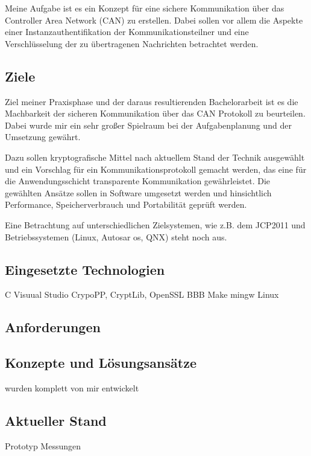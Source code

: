 Meine Aufgabe ist es ein Konzept für eine sichere Kommunikation über das Controller Area Network (CAN) zu erstellen. 
Dabei sollen vor allem die Aspekte einer Instanzauthentifikation der Kommunikationsteilner und eine Verschlüsselung der zu übertragenen Nachrichten betrachtet werden. 


\subsection{Ziele}
Ziel meiner Praxisphase und der daraus resultierenden Bachelorarbeit ist es die Machbarkeit der sicheren Kommunikation über das CAN Protokoll zu beurteilen.
\newline
Dabei wurde mir ein sehr großer Spielraum bei der Aufgabenplanung und der Umsetzung gewährt. 


 Dazu sollen kryptografische Mittel nach aktuellem Stand der Technik ausgewählt und ein Vorschlag für ein Kommunikationsprotokoll gemacht werden, das eine für die Anwendungsschicht transparente Kommunikation gewährleistet. Die gewählten Ansätze sollen in Software umgesetzt werden und hinsichtlich Performance, Speicherverbrauch und Portabilität geprüft werden. 

Eine Betrachtung auf unterschiedlichen Zielsystemen, wie z.B. dem JCP2011 und Betriebssystemen (Linux, Autosar os, QNX) steht noch aus.
\subsection{Eingesetzte Technologien}

C 
Visuual Studio 
CrypoPP, CryptLib, OpenSSL
BBB
Make mingw Linux 

\subsection{Anforderungen}

\subsection{Konzepte und Lösungsansätze}
wurden komplett von mir entwickelt

\subsection{Aktueller Stand} %
Prototyp 
Messungen
